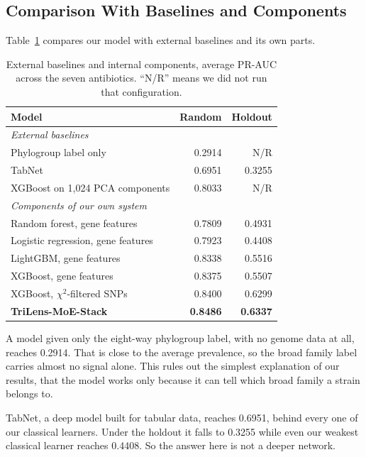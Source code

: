 \documentclass[conference]{IEEEtran}
\begin{document}
\subsection{Comparison With Baselines and Components}

Table~\ref{tab:baselines} compares our model with external baselines and its own
parts.

\begin{table}[t]
\caption{External baselines and internal components, average PR-AUC across the
seven antibiotics. ``N/R'' means we did not run that configuration.}
\label{tab:baselines}
\centering
\small
\setlength{\tabcolsep}{4pt}
\renewcommand{\arraystretch}{1.15}
\begin{tabular}{|l|r|r|}
\hline
\rowcolor{headgrey}
\textbf{Model} & \textbf{Random} & \textbf{Holdout} \\ \hline
\multicolumn{3}{|l|}{\textit{External baselines}} \\ \hline
Phylogroup label only & 0.2914 & N/R \\ \hline
TabNet & 0.6951 & 0.3255 \\ \hline
XGBoost on 1{,}024 PCA components & 0.8033 & N/R \\ \hline
\multicolumn{3}{|l|}{\textit{Components of our own system}} \\ \hline
Random forest, gene features & 0.7809 & 0.4931 \\ \hline
Logistic regression, gene features & 0.7923 & 0.4408 \\ \hline
LightGBM, gene features & 0.8338 & 0.5516 \\ \hline
XGBoost, gene features & 0.8375 & 0.5507 \\ \hline
XGBoost, $\chi^2$-filtered SNPs & 0.8400 & 0.6299 \\ \hline
\rowcolor{oursblue}
\textbf{TriLens-MoE-Stack} & \textbf{0.8486} & \textbf{0.6337} \\ \hline
\end{tabular}
\renewcommand{\arraystretch}{1.0}
\end{table}

A model given only the eight-way phylogroup label, with no genome data at all,
reaches 0.2914. That is close to the average prevalence, so the broad family label
carries almost no signal alone. This rules out the simplest explanation of our
results, that the model works only because it can tell which broad family a strain
belongs to.

TabNet, a deep model built for tabular data, reaches 0.6951, behind every one of our
classical learners. Under the holdout it falls to 0.3255 while even our weakest
classical learner reaches 0.4408. So the answer here is not a deeper network.
\end{document}
